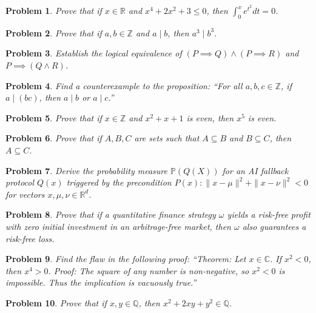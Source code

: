 \documentclass[12pt]{article}
\newtheorem{problem}{Problem}
\begin{document}
\begin{problem}
Prove that if $x \in \mathbb{R}$ and $x^4 + 2x^2 + 3 \le 0$, then $\int_0^x e^{t^2} dt = 0$.
\end{problem}

\begin{problem}
Prove that if $a, b \in \mathbb{Z}$ and $a \mid b$, then $a^3 \mid b^3$.
\end{problem}

\begin{problem}
Establish the logical equivalence of $(P \implies Q) \land (P \implies R)$ and $P \implies (Q \land R)$.
\end{problem}

\begin{problem}
Find a counterexample to the proposition: ``For all $a, b, c \in \mathbb{Z}$, if $a \mid (bc)$, then $a \mid b$ or $a \mid c$.''
\end{problem}

\begin{problem}
Prove that if $x \in \mathbb{Z}$ and $x^2 + x + 1$ is even, then $x^5$ is even.
\end{problem}

\begin{problem}
Prove that if $A, B, C$ are sets such that $A \subseteq B$ and $B \subseteq C$, then $A \subseteq C$.
\end{problem}

\begin{problem}
Derive the probability measure $\mathbb{P}(Q(X))$ for an AI fallback protocol $Q(x)$ triggered by the precondition $P(x) : \|x - \mu\|^2 + \|x - \nu\|^2 < 0$ for vectors $x, \mu, \nu \in \mathbb{R}^d$.
\end{problem}

\begin{problem}
Prove that if a quantitative finance strategy $\omega$ yields a risk-free profit with zero initial investment in an arbitrage-free market, then $\omega$ also guarantees a risk-free loss.
\end{problem}

\begin{problem}
Find the flaw in the following proof: ``Theorem: Let $x \in \mathbb{C}$. If $x^2 < 0$, then $x^4 > 0$. Proof: The square of any number is non-negative, so $x^2 < 0$ is impossible. Thus the implication is vacuously true.''
\end{problem}

\begin{problem}
Prove that if $x, y \in \mathbb{Q}$, then $x^2 + 2xy + y^2 \in \mathbb{Q}$.
\end{problem}
\end{document}
